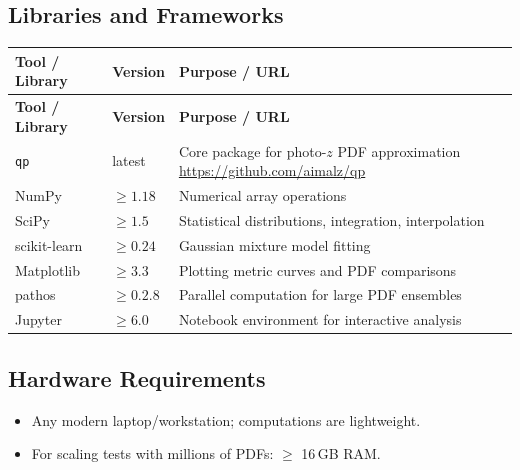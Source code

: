 \documentclass[11pt,a4paper]{article}
\begin{document}
\subsection{Libraries and Frameworks}
\begin{longtable}{p{4.5cm} p{2.5cm} p{6.5cm}}
\toprule
\textbf{Tool / Library} & \textbf{Version} & \textbf{Purpose / URL} \\
\midrule
\endfirsthead
\toprule
\textbf{Tool / Library} & \textbf{Version} & \textbf{Purpose / URL} \\
\midrule
\endhead
\texttt{qp} & latest & Core package for photo-$z$ PDF approximation \newline \url{https://github.com/aimalz/qp} \\
\midrule
NumPy & $\geq 1.18$ & Numerical array operations \\
\midrule
SciPy & $\geq 1.5$ & Statistical distributions, integration, interpolation \\
\midrule
scikit-learn & $\geq 0.24$ & Gaussian mixture model fitting \\
\midrule
Matplotlib & $\geq 3.3$ & Plotting metric curves and PDF comparisons \\
\midrule
pathos & $\geq 0.2.8$ & Parallel computation for large PDF ensembles \\
\midrule
Jupyter & $\geq 6.0$ & Notebook environment for interactive analysis \\
\bottomrule
\end{longtable}

\subsection{Hardware Requirements}
\begin{itemize}
  \item Any modern laptop/workstation; computations are lightweight.
  \item For scaling tests with millions of PDFs: $\geq$ 16\,GB RAM.
\end{itemize}
\end{document}
